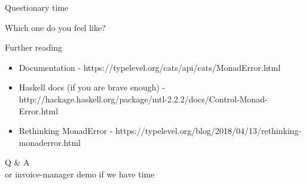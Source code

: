 \documentclass[13pt]{beamer}
\begin{document}
\begin{frame}{Questionary time}

  Which one do you feel like?

  \begin{figure}%
    \centering
    \qquad
  \end{figure}


\end{frame}

\begin{frame}{Further reading}
  \begin{itemize}
    \item Documentation - https://typelevel.org/cats/api/cats/MonadError.html
    \item Haskell docs (if you are brave enough) - http://hackage.haskell.org/package/mtl-2.2.2/docs/Control-Monad-Error.html
    \item Rethinking MonadError - https://typelevel.org/blog/2018/04/13/rethinking-monaderror.html
  \end{itemize}
\end{frame}

\begin{frame}[plain, c]
  \begin{center}
  {\Huge Q \& A}\\

  {\tiny or invoice-manager demo if we have time}
  \end{center}
\end{frame}
\end{document}
